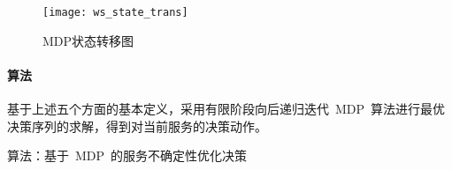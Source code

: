 \begin{figure}[htbp]
    \centering
    \texttt{[image: ws\_state\_trans]}
    \caption{MDP状态转移图}\label{figure:ws_state_trans}
    \vspace{-1em}
\end{figure}

%
%
%
%
%
%

\paragraph{算法}

基于上述五个方面的基本定义，采用有限阶段向后递归迭代~MDP~算法进行最优决策序列的求解，得到对当前服务的决策动作。

算法：基于~MDP~的服务不确定性优化决策

